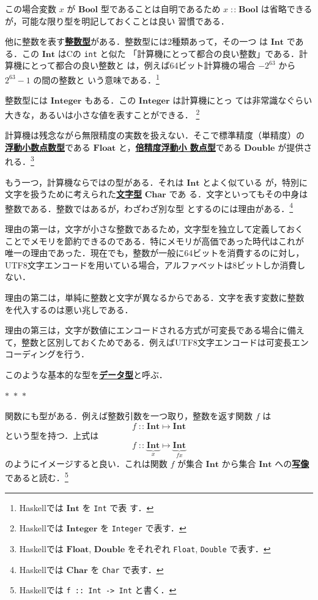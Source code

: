 \documentclass[a5paper,twoside,fleqn,draft]{jsbook}
\newcommand{\separator}{\begin{center}$*$~$*$~$*$\end{center}}
\newcommand{\programminglanguage}[1]{\textsf{#1}}
\newcommand{\clang}{\programminglanguage{C}}
\newcommand{\haskell}{\programminglanguage{Haskell}}
\newcommand{\keyword}[1]{{\underline{\textbf{#1}}}}
\newcommand{\code}[1]{\texttt{#1}}
\DeclareMathOperator{\mIn}{{:\!:}}
\DeclareMathOperator{\mMapsTo}{\mapsto}
\newcommand{\mType}[1]{\mathbf{#1}} %
\newcommand{\mBoolType}{\mType{Bool}}
\newcommand{\mCharType}{\mType{Char}}
\newcommand{\mFloatType}{\mType{Float}}
\newcommand{\mDoubleType}{\mType{Double}}
\newcommand{\mIntType}{\mType{Int}}
\newcommand{\mIntegerType}{\mType{Integer}}
\begin{document}
この場合変数 $x$ が $\mBoolType$ 型であることは自明であるため
$x\mIn\mBoolType$ は省略できるが，可能な限り型を明記しておくことは良い
習慣である．

他に整数を表す\keyword{整数型}がある．整数型には2種類あって，その一つ
は $\mIntType$ である．この $\mIntType$ は\clang の \code{int} と似た
「計算機にとって都合の良い整数」である．計算機にとって都合の良い整数と
は，例えば64ビット計算機の場合 $-2^{63}$ から $2^{63}-1$ の間の整数と
いう意味である．\footnote{\haskell では $\mIntType$ を \code{Int} で表
  す．}

整数型には $\mIntegerType$ もある．この $\mIntegerType$ は計算機にとっ
ては非常識なぐらい大きな，あるいは小さな値を表すことができる．
\footnote{\haskell では $\mIntegerType$ を \code{Integer} で表す．}

計算機は残念ながら無限精度の実数を扱えない．そこで標準精度（単精度）の
\keyword{浮動小数点数型}である $\mFloatType$ と，\keyword{倍精度浮動小
  数点型}である $\mDoubleType$ が提供される．\footnote{\haskell では
  $\mFloatType$, $\mDoubleType$ をそれぞれ \code{Float}, \code{Double}
  で表す．}

もう一つ，計算機ならではの型がある．それは $\mIntType$ とよく似ている
が，特別に文字を扱うために考えられた\keyword{文字型} $\mCharType$ であ
る．文字といってもその中身は整数である．整数ではあるが，わざわざ別な型
とするのには理由がある．\footnote{\haskell では $\mCharType$ を
  \code{Char} で表す．}

理由の第一は，文字が小さな整数であるため，文字型を独立して定義しておく
ことでメモリを節約できるのである．特にメモリが高価であった時代はこれが
唯一の理由であった．現在でも，整数が一般に64ビットを消費するのに対し，
UTF8文字エンコードを用いている場合，アルファベットは8ビットしか消費し
ない．

理由の第二は，単純に整数と文字が異なるからである．文字を表す変数に整数
を代入するのは悪い兆しである．

理由の第三は，文字が数値にエンコードされる方式が可変長である場合に備え
て，整数と区別しておくためである．例えばUTF8文字エンコードは可変長エン
コーディングを行う．

このような基本的な型を\keyword{データ型}と呼ぶ．

\separator

関数にも型がある．例えば整数引数を一つ取り，整数を返す関数 $f$ は
\begin{equation}
  f
  \mIn\mIntType
  \mMapsTo\mIntType
\end{equation}
という型を持つ．上式は
\begin{equation}
  f
  \mIn\underbrace{\mIntType}_{x}
  \mMapsTo\underbrace{\mIntType}_{fx}
\end{equation}
のようにイメージすると良い．これは関数 $f$ が集合 $\mIntType$ から集合
$\mIntType$ への\keyword{写像}であると読む．\footnote{\haskell では
  \code{f :: Int -> Int} と書く．}
\end{document}
